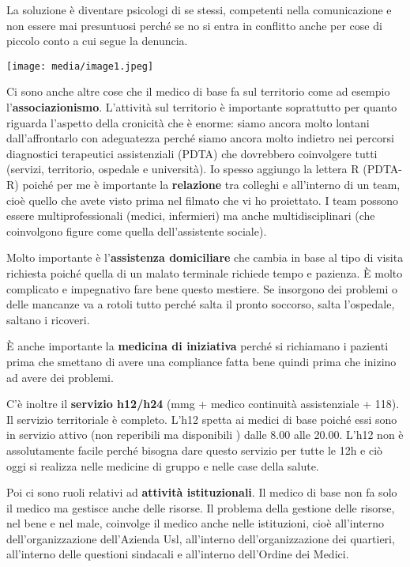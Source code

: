 \documentclass[]{article}
\begin{document}
La soluzione è diventare psicologi di se stessi, competenti nella
comunicazione e non essere mai presuntuosi perché se no si entra in
conflitto anche per cose di piccolo conto a cui segue la denuncia.

\texttt{[image: media/image1.jpeg]}

Ci sono anche altre cose che il medico di base fa sul territorio come ad
esempio l'\textbf{associazionismo}. L'attività sul territorio è
importante soprattutto per quanto riguarda l'aspetto della cronicità che
è enorme: siamo ancora molto lontani dall'affrontarlo con adeguatezza
perché siamo ancora molto indietro nei percorsi diagnostici terapeutici
assistenziali (PDTA) che dovrebbero coinvolgere tutti (servizi,
territorio, ospedale e università). Io spesso aggiungo la lettera R
(PDTA-R) poiché per me è importante la \textbf{relazione} tra colleghi e
all'interno di un team, cioè quello che avete visto prima nel filmato
che vi ho proiettato. I team possono essere multiprofessionali (medici,
infermieri) ma anche multidisciplinari (che coinvolgono figure come
quella dell'assistente sociale).

Molto importante è l'\textbf{assistenza domiciliare} che cambia in base
al tipo di visita richiesta poiché quella di un malato terminale
richiede tempo e pazienza. È molto complicato e impegnativo fare bene
questo mestiere. Se insorgono dei problemi o delle mancanze va a rotoli
tutto perché salta il pronto soccorso, salta l'ospedale, saltano i
ricoveri.

È anche importante la \textbf{medicina di iniziativa} perché si
richiamano i pazienti prima che smettano di avere una compliance fatta
bene quindi prima che inizino ad avere dei problemi.

C'è inoltre il \textbf{servizio h12/h24} (mmg + medico continuità
assistenziale + 118). Il servizio territoriale è completo. L'h12 spetta
ai medici di base poiché essi sono in servizio attivo (non reperibili ma
disponibili ) dalle 8.00 alle 20.00. L'h12 non è assolutamente facile
perché bisogna dare questo servizio per tutte le 12h e ciò oggi si
realizza nelle medicine di gruppo e nelle case della salute.

Poi ci sono ruoli relativi ad \textbf{attività istituzionali}. Il medico
di base non fa solo il medico ma gestisce anche delle risorse. Il
problema della gestione delle risorse, nel bene e nel male, coinvolge il
medico anche nelle istituzioni, cioè all'interno dell'organizzazione
dell'Azienda Usl, all'interno dell'organizzazione dei quartieri,
all'interno delle questioni sindacali e all'interno dell'Ordine dei
Medici.
\end{document}
